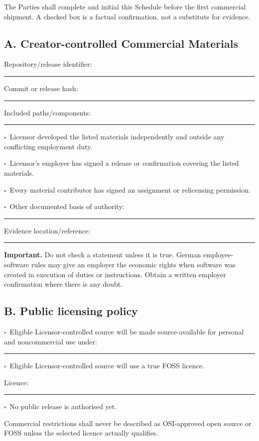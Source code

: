 \documentclass[11pt,a4paper]{article}
\newcommand{\blank}[1]{\rule{#1}{0.45pt}}
\newcommand{\checkbox}{\(\square\)}
\newcommand{\warning}[1]{%
  \par\medskip\noindent
  \colorbox{papergray}{\parbox{0.94\linewidth}{\textbf{Important.} #1}}
  \par\medskip
}
\begin{document}
The Parties shall complete and initial this Schedule before the first commercial shipment. A checked box is a factual confirmation, not a substitute for evidence.

\subsection*{A. Creator-controlled Commercial Materials}

Repository/release identifier: \blank{106mm}\par
Commit or release hash: \blank{113mm}\par
Included paths/components: \blank{104mm}\par\vspace{5mm}

\checkbox\ Licensor developed the listed materials independently and outside any conflicting employment duty.\par
\checkbox\ Licensor's employer has signed a release or confirmation covering the listed materials.\par
\checkbox\ Every material contributor has signed an assignment or relicensing permission.\par
\checkbox\ Other documented basis of authority: \blank{89mm}\par

Evidence location/reference: \blank{108mm}\par

\warning{Do not check a statement unless it is true. German employee-software rules may give an employer the economic rights when software was created in execution of duties or instructions. Obtain a written employer confirmation where there is any doubt.}

\subsection*{B. Public licensing policy}

\checkbox\ Eligible Licensor-controlled source will be made source-available for personal and noncommercial use under: \blank{52mm}\par
\checkbox\ Eligible Licensor-controlled source will use a true FOSS licence.\par
Licence: \blank{126mm}\par
\checkbox\ No public release is authorised yet.\par

Commercial restrictions shall never be described as OSI-approved open source or FOSS unless the selected licence actually qualifies.
\end{document}
